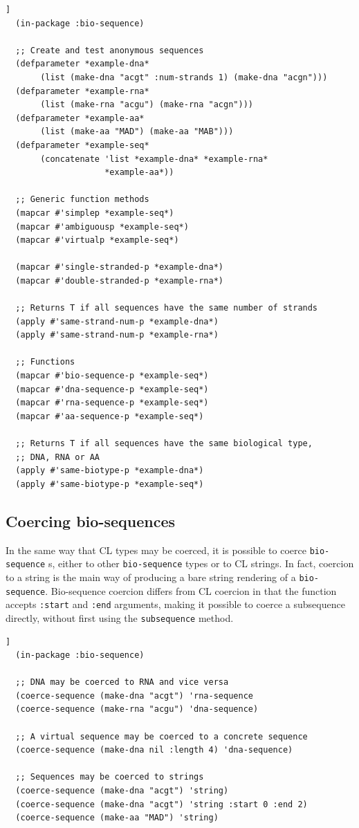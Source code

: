 \documentclass[a4paper, 12pt]{article}
\begin{document}
\begin{lstlisting}[caption={Testing bio-sequences},
  label=lst:testing-bioseq,float=[tbph]]
  (in-package :bio-sequence)

  ;; Create and test anonymous sequences
  (defparameter *example-dna*
       (list (make-dna "acgt" :num-strands 1) (make-dna "acgn")))
  (defparameter *example-rna*
       (list (make-rna "acgu") (make-rna "acgn")))
  (defparameter *example-aa*
       (list (make-aa "MAD") (make-aa "MAB")))
  (defparameter *example-seq*
       (concatenate 'list *example-dna* *example-rna*
                    *example-aa*))

  ;; Generic function methods
  (mapcar #'simplep *example-seq*)
  (mapcar #'ambiguousp *example-seq*)
  (mapcar #'virtualp *example-seq*)
  
  (mapcar #'single-stranded-p *example-dna*)
  (mapcar #'double-stranded-p *example-rna*)

  ;; Returns T if all sequences have the same number of strands
  (apply #'same-strand-num-p *example-dna*)
  (apply #'same-strand-num-p *example-rna*)
  
  ;; Functions
  (mapcar #'bio-sequence-p *example-seq*)
  (mapcar #'dna-sequence-p *example-seq*)
  (mapcar #'rna-sequence-p *example-seq*)
  (mapcar #'aa-sequence-p *example-seq*)

  ;; Returns T if all sequences have the same biological type,
  ;; DNA, RNA or AA
  (apply #'same-biotype-p *example-dna*)
  (apply #'same-biotype-p *example-seq*)
\end{lstlisting}

\subsection{Coercing bio-sequences}
\label{sec:coerce-bioseq}

In the same way that CL types may be coerced, it is possible to coerce
\lstinline!bio-sequence! s, either to other \lstinline!bio-sequence!
types or to CL strings. In fact, coercion to a string is the main way
of producing a bare string rendering of a
\lstinline!bio-sequence!. Bio-sequence coercion differs from CL
coercion in that the function accepts \lstinline!:start! and
\lstinline!:end! arguments, making it possible to coerce a subsequence
directly, without first using the \lstinline!subsequence! method.

\begin{lstlisting}[caption={Coercing bio-sequences},
  label=lst:coercing-bioseq,float=[tbph]]
  (in-package :bio-sequence)

  ;; DNA may be coerced to RNA and vice versa
  (coerce-sequence (make-dna "acgt") 'rna-sequence
  (coerce-sequence (make-rna "acgu") 'dna-sequence)

  ;; A virtual sequence may be coerced to a concrete sequence
  (coerce-sequence (make-dna nil :length 4) 'dna-sequence)

  ;; Sequences may be coerced to strings
  (coerce-sequence (make-dna "acgt") 'string)
  (coerce-sequence (make-dna "acgt") 'string :start 0 :end 2)
  (coerce-sequence (make-aa "MAD") 'string)
\end{lstlisting}




\end{document}
